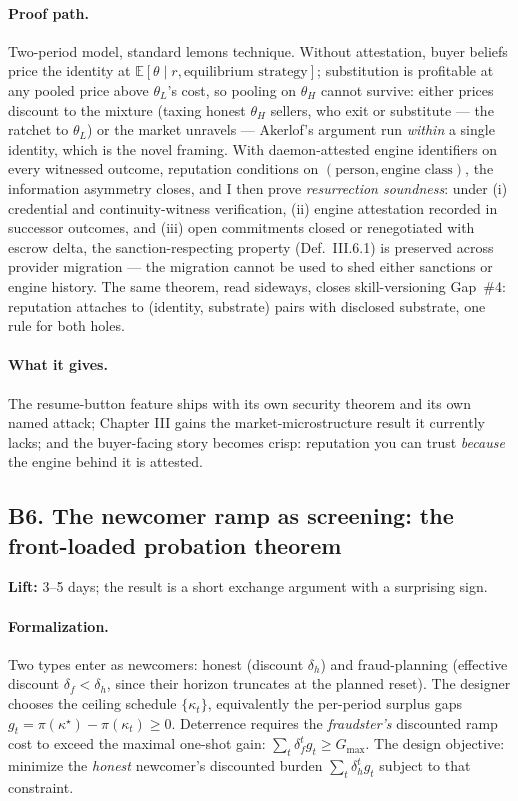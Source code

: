 \documentclass[11pt,a4paper]{article}
\newcommand{\lift}[1]{\noindent\textbf{Lift:} #1.}
\newcommand{\gives}{\paragraph{What it gives.}}
\newcommand{\form}{\paragraph{Formalization.}}
\newcommand{\proofpath}{\paragraph{Proof path.}}
\begin{document}
\proofpath Two-period model, standard lemons technique. Without attestation, buyer beliefs price the identity at $\mathbb{E}[\theta \mid r, \text{equilibrium strategy}]$; substitution is profitable at any pooled price above $\theta_L$'s cost, so pooling on $\theta_H$ cannot survive: either prices discount to the mixture (taxing honest $\theta_H$ sellers, who exit or substitute --- the ratchet to $\theta_L$) or the market unravels --- Akerlof's argument run \emph{within} a single identity, which is the novel framing. With daemon-attested engine identifiers on every witnessed outcome, reputation conditions on $(\text{person}, \text{engine class})$, the information asymmetry closes, and I then prove \emph{resurrection soundness}: under (i) credential and continuity-witness verification, (ii) engine attestation recorded in successor outcomes, and (iii) open commitments closed or renegotiated with escrow delta, the sanction-respecting property (Def.~III.6.1) is preserved across provider migration --- the migration cannot be used to shed either sanctions or engine history. The same theorem, read sideways, closes skill-versioning Gap~\#4: reputation attaches to (identity, substrate) pairs with disclosed substrate, one rule for both holes.

\gives The resume-button feature ships with its own security theorem and its own named attack; Chapter III gains the market-microstructure result it currently lacks; and the buyer-facing story becomes crisp: reputation you can trust \emph{because} the engine behind it is attested.

\subsection{B6. The newcomer ramp as screening: the front-loaded probation theorem}
\lift{3--5 days; the result is a short exchange argument with a surprising sign}

\form Two types enter as newcomers: honest (discount $\delta_h$) and fraud-planning (effective discount $\delta_f < \delta_h$, since their horizon truncates at the planned reset). The designer chooses the ceiling schedule $\{\kappa_t\}$, equivalently the per-period surplus gaps $g_t = \pi(\kappa^\star) - \pi(\kappa_t) \ge 0$. Deterrence requires the \emph{fraudster's} discounted ramp cost to exceed the maximal one-shot gain: $\sum_t \delta_f^t g_t \ge G_{\max}$. The design objective: minimize the \emph{honest} newcomer's discounted burden $\sum_t \delta_h^t g_t$ subject to that constraint.
\end{document}
